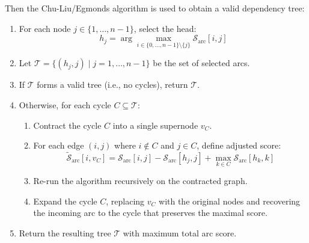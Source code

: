 \documentclass{article}
\begin{document}
		Then the Chu-Liu/Egmonds algorithm is used to obtain a valid dependency tree:

		\begin{enumerate}
		    \item For each node $j \in \{1, \dots, n-1\}$, select the head:
		    \[
		        h_j = \arg\max_{i \in \{0, \dots, n-1\} \setminus \{j\}} \mathcal{S}_\text{arc}[i,j]
		    \]
		    \item Let $\mathcal{T} = \{(h_j, j) \mid j = 1, \dots, n-1\}$ be the set of selected arcs.
		    \item If $\mathcal{T}$ forms a valid tree (i.e., no cycles), return $\mathcal{T}$.
		    \item Otherwise, for each cycle $C \subseteq \mathcal{T}$:
		    \begin{enumerate}
		        \item Contract the cycle $C$ into a single supernode $v_C$.
		        \item For each edge $(i, j)$ where $i \notin C$ and $j \in C$, define adjusted score:
		        \[
		            \tilde{\mathcal{S}}_\text{arc}[i, v_C] = \mathcal{S}_\text{arc}[i, j] - \mathcal{S}_\text{arc}[h_j, j] + \max_{k \in C} \mathcal{S}_\text{arc}[h_k, k]
		        \]
		        \item Re-run the algorithm recursively on the contracted graph.
		        \item Expand the cycle $C$, replacing $v_C$ with the original nodes and recovering the incoming arc to the cycle that preserves the maximal score.
		    \end{enumerate}
		    \item Return the resulting tree $\mathcal{T}$ with maximum total arc score.
		\end{enumerate}
\end{document}
